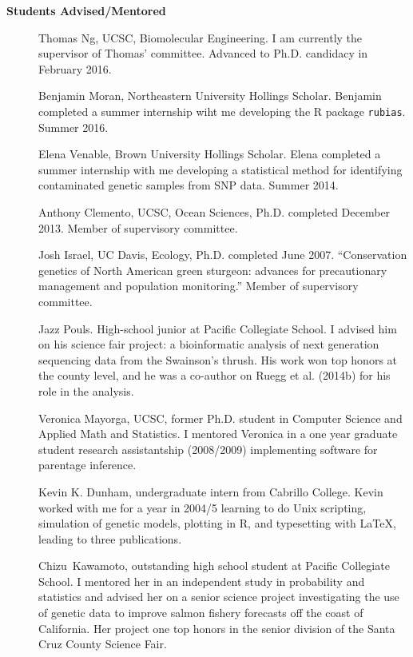 \documentclass[11pt]{article}
\newlength{\postskip}
\begin{document}
{\bf Students Advised/Mentored}
\begin{description}
\item[] Thomas Ng, UCSC, Biomolecular Engineering.  I am currently the supervisor of Thomas' committee.  Advanced to Ph.D. candidacy in February 2016.
\item[] Benjamin Moran, Northeastern University Hollings Scholar.  Benjamin completed a summer internship wiht
me developing the R package {\tt rubias}. Summer 2016.
\item[] Elena Venable, Brown University Hollings Scholar.  Elena completed a summer internship with me developing 
a statistical method for identifying contaminated genetic samples from SNP data. Summer 2014.
\item[] Anthony Clemento, UCSC, Ocean Sciences, Ph.D. completed December 2013.  Member of supervisory committee.
\item[] Josh Israel, UC Davis, Ecology,  Ph.D. completed June 2007. ``Conservation genetics of North American green sturgeon: advances for precautionary management and population monitoring.'' Member of supervisory committee.
\item[] Jazz Pouls.  High-school junior at Pacific Collegiate School.  I advised him on his science fair project:
a bioinformatic analysis of next generation sequencing data from the Swainson's thrush.  His work won top honors
at the county level, and he was a co-author on Ruegg et al. (2014b) for his role in the analysis.
\item[] Veronica Mayorga, UCSC,  former Ph.D. student in Computer Science and Applied Math and Statistics. I mentored Veronica in a one year graduate student research assistantship (2008/2009) implementing software for parentage inference.
\item[] Kevin K. Dunham,  undergraduate intern from Cabrillo College.  Kevin worked with me for a year in 2004/5 learning to do Unix scripting, simulation of genetic models, plotting in R, and typesetting with \LaTeX{}, leading to three publications. 
\item[] Chizu~Kawamoto, outstanding high school student at Pacific Collegiate School.  I mentored her in an independent study in probability and statistics and advised her on a senior science project investigating the use of genetic data to improve salmon fishery forecasts off the coast of California.  Her project one top honors in the senior division of the Santa Cruz County Science Fair.

\end{description}
\vspace*{\postskip}
\end{document}
